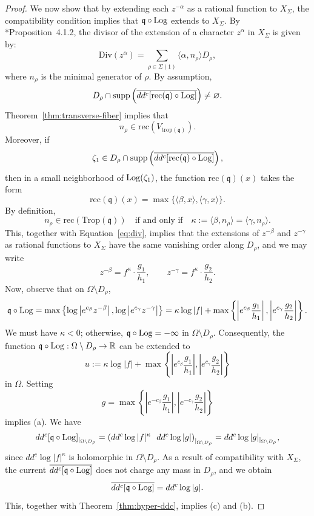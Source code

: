 \documentclass[11pt]{amsart}
\def\Log{{\rm Log}}
\theoremstyle{definition}
\newcommand{\trop}{\mathrm{trop}}
\newcommand{\fq}{\mathfrak{q}}
\newcommand{\Trop}{\mathrm{Trop}}
\begin{document}
\begin{proof}
We now show that by extending each \(z^{-\alpha}\) as a rational function to \(X_{\Sigma}\), the compatibility condition implies that \(\fq \circ \Log\) extends to \(X_{\Sigma}\). By \cite{Cox-Little-Schenck}*{Proposition~4.1.2}, the divisor of the extension of a character \(z^{\alpha}\) in \(X_{\Sigma}\) is given by:
\begin{equation}\label{eq:div}
\mathrm{Div}(z^{\alpha}) = \sum_{\rho \in \Sigma(1)} \langle \alpha, n_{\rho} \rangle D_{\rho},
\end{equation}
where \(n_{\rho}\) is the minimal generator of \(\rho\).
By assumption,
\[
D_{\rho} \cap \operatorname{supp} \left( \overline{dd^c[\mathrm{rec}(\fq) \circ \Log]} \right) \neq \varnothing.
\]
Theorem~\ref{thm:transverse-fiber} implies that
\[
n_{\rho} \in \mathrm{rec}(V_{\trop(\fq)}).
\]
Moreover, if  
\[
\zeta_1 \in D_{\rho} \cap \operatorname{supp}\left( \overline{dd^c[\mathrm{rec}(\fq) \circ \Log]} \right),
\]
then in a small neighborhood of \( \Log(\zeta_1) \), the function \( \mathrm{rec}(\fq)(x) \) takes the form
\[
\mathrm{rec}(\fq)(x) = \max\{ \langle \beta, x \rangle, \langle \gamma, x \rangle \}.
\]
By definition,
\[
n_{\rho} \in \mathrm{rec}(\Trop(\fq)) \quad \text{if and only if} \quad \kappa := \langle \beta, n_{\rho} \rangle = \langle \gamma, n_{\rho} \rangle.
\]
This, together with Equation~\eqref{eq:div}, implies that the extensions of \( z^{-\beta} \) and \( z^{-\gamma} \) as rational functions to \( X_{\Sigma} \) have the same vanishing order along \( D_{\rho} \), and we may write
\[
z^{-\beta} = f^{\kappa} \cdot \frac{g_1}{h_1}, \qquad z^{-\gamma} = f^{\kappa} \cdot \frac{g_2}{h_2}.
\]
Now, observe that on \( \Omega \setminus D_{\rho} \),
\[
\fq \circ \Log = \max \left\{ \log \left| e^{c_{\beta}} z^{-\beta} \right|, \log \left| e^{c_{\gamma}} z^{-\gamma} \right| \right\} = \kappa \log |f| + \max \left\{ \left| e^{c_{\beta}} \frac{g_1}{h_1} \right|, \left| e^{c_{\gamma}} \frac{g_2}{h_2} \right| \right\}.
\]
We must have \( \kappa < 0 \); otherwise, \( \fq \circ \Log = -\infty \) in \( \Omega \setminus D_{\rho} \). Consequently, the function \( \fq \circ \Log : \Omega \setminus D_{\rho} \to \mathbb{R} \) can be extended to
\[
u := \kappa \log|f| + \max\left\{ \left| e^{c_\beta} \frac{g_1}{h_1} \right|, \left| e^{c_\gamma} \frac{g_2}{h_2} \right| \right\}
\]
in \( \Omega \). Setting
\[
g = \max\left\{ \left| e^{-c_\beta} \frac{g_1}{h_1} \right|, \left| e^{-c_\gamma} \frac{g_2}{h_2} \right| \right\}
\]
implies (a). We have
\[
dd^c [\fq \circ \Log]_{\mid_{\Omega \setminus D_{\rho}}}
= \left( dd^c \log |f|^\kappa ~~ dd^c \log|g| \right)_{\mid_{\Omega \setminus D_{\rho}}}
= dd^c \log|g|_{\mid_{\Omega \setminus D_{\rho}}},
\]
since \( dd^c \log |f|^{\kappa} \) is holomorphic in \( \Omega \setminus D_{\rho} \). As a result of compatibility with \( X_{\Sigma} \), the current \( \overline{dd^c [\fq \circ \Log]} \) does not charge any mass in \( D_{\rho} \), and we obtain
\[
\overline{dd^c [\fq \circ \Log]} = dd^c \log|g|.
\]
This, together with Theorem~\ref{thm:hyper-ddc}, implies (c) and (b).

\end{proof}
\end{document}
